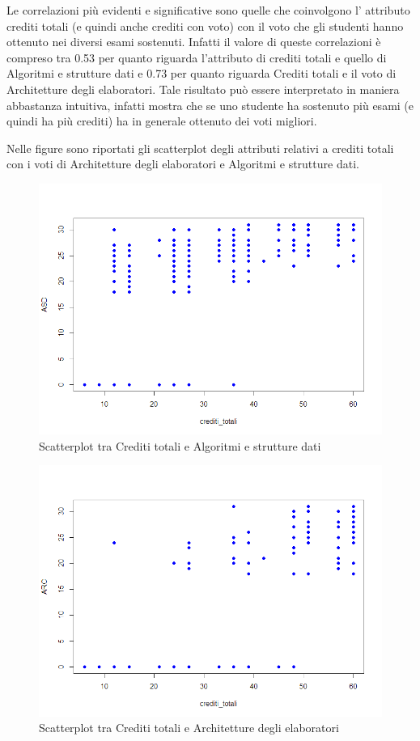 \documentclass[12pt]{article}
\begin{document}
Le correlazioni più evidenti e significative sono quelle che coinvolgono l' attributo crediti totali (e quindi anche crediti con voto) con il voto che gli studenti hanno ottenuto nei diversi esami sostenuti.
Infatti il valore di queste correlazioni è compreso tra 0.53 per quanto riguarda l'attributo di crediti totali e quello di Algoritmi e strutture dati e 0.73 per quanto riguarda Crediti totali e il voto di Architetture degli elaboratori.
Tale risul\-tato può essere interpretato in maniera abbastanza intuitiva, infatti mostra che se uno studente ha sostenuto più esami (e quindi ha più crediti) ha in generale ottenuto dei voti migliori.

Nelle figure sono riportati gli scatterplot degli attributi relativi a crediti totali con i voti di Architetture degli elaboratori e Algoritmi e strutture dati.
\begin{figure}[H]
	\includegraphics[width=\textwidth]{img/creditiAsd.png}
	\caption{Scatterplot tra Crediti totali e Algoritmi e strutture dati}
\end{figure}

\begin{figure}[H]
	\includegraphics[width=\textwidth]{img/creditiArc.png}
	\caption{Scatterplot tra Crediti totali e Architetture degli elaboratori}
\end{figure}
\end{document}
